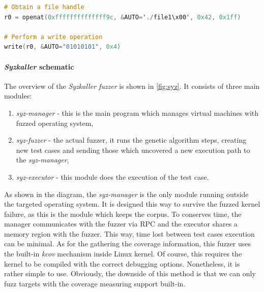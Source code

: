 \begin{minipage}\linewidth
    \begin{lstlisting}[language=C,caption={\textit{Syzkaller} DSL describing syscalls \cite{syzkaller_repo}.},captionpos=b,label={syzkaller_dsl}]
# Obtain a file handle
r0 = openat(0xffffffffffffff9c, &AUTO='./file1\x00', 0x42, 0x1ff)

# Perform a write operation
write(r0, &AUTO="01010101", 0x4)
    \end{lstlisting} 
\end{minipage}

\paragraph{\textit{Syzkaller} schematic}

The overview of the \textit{Syzkaller fuzzer} is shown in \ref{fig:syz}. It consists of three main modules:
\begin{enumerate}
    \item \textit{syz-manager} - this is the main program which manages virtual machines with fuzzed operating system,
    \item \textit{syz-fuzzer} - the actual fuzzer, it runs the genetic algorithm steps, creating new test cases and sending those which uncovered a new execution path to the \textit{syz-manager},
    \item \textit{syz-executor} - this module does the execution of the test case.
\end{enumerate}
As shown in the diagram, the \textit{syz-manager} is the only module running outside the targeted operating system. It is designed this way to survive the fuzzed kernel failure, as this is the module which keeps the corpus. To conserves time, the manager communicates with the fuzzer via RPC and the executor shares a memory region with the fuzzer. This way, time lost between test cases execution can be minimal. As for the gathering the coverage information, this fuzzer uses the built-in \textit{kcov} mechanism inside Linux kernel. Of course, this requires the kernel to be compiled with the correct debugging options. Nonetheless, it is rather simple to use. Obviously, the downside of this method is that we can only fuzz targets with the coverage measuring support built-in.

